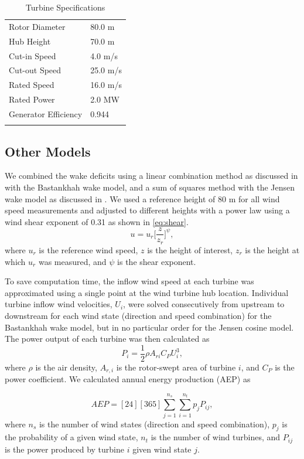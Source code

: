 \documentclass{jpconf}
\begin{document}
%
\begin{table}[h!]
	\caption{Turbine Specifications}
	\label{tab:v80}
	\centering
	\begin{tabular}{l l}
		\br
		Rotor Diameter & 80.0 m\\
		Hub Height & 70.0 m \\
		Cut-in Speed & 4.0 m/s\\
		Cut-out Speed & 25.0 m/s \\
		Rated Speed & 16.0 m/s \\
		Rated Power & 2.0 MW \\
		Generator Efficiency & 0.944 \\
		\br
	\end{tabular}
\end{table}

\subsection{Other Models}
We combined the wake deficits using a linear combination method as discussed in \cite{niayifar2016} with the Bastankhah wake model, and a sum of squares method with the Jensen wake model as discussed in \cite{katic1986}. We used a reference height of 80 m for all wind speed measurements and adjusted to different heights with a power law using a wind shear exponent of 0.31 as shown in \cref{eq:shear}. 
%
\begin{equation} \label{eq:shear}
u = u_r\bigg[\frac{z}{z_r}\bigg]^\psi,
\end{equation}
%
where $u_r$ is the reference wind speed, $z$ is the height of interest, $z_r$ is the height at which $u_r$ was measured, and $\psi$ is the shear exponent.

To save computation time, the inflow wind speed at each turbine was approximated using a single point at the wind turbine hub location. Individual turbine inflow wind velocities, $U_i$, were solved consecutively from upstream to downstream for each wind state (direction and speed combination) for the Bastankhah wake model, but in no particular order for the Jensen cosine model. The power output of each turbine was then calculated as
%
\begin{equation}\label{eq:power}
P_i = \frac{1}{2}\rho A_{ri}C_P U_i^3,
\end{equation}
%
where $\rho$ is the air density, $A_{r,i}$ is the rotor-swept area of turbine $i$, and $C_P$ is the power coefficient. We calculated annual energy production (AEP) as

\begin{equation} \label{eq:aep}
AEP = [24][365]\sum_{j=1}^{n_s} \sum_{i=1}^{n_t} p_j P_{ij},
\end{equation}
%
 where $n_s$ is the number of wind states (direction and speed combination), $p_j$ is the probability of a given wind state, $n_t$ is the number of wind turbines, and $P_{ij}$ is the power produced by turbine $i$ given wind state $j$.
\end{document}
